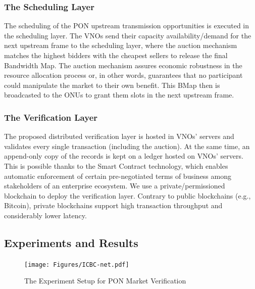 \subsubsection{The Scheduling Layer}
The scheduling of the \ac{PON} upstream transmission opportunities is executed in the scheduling layer. The \acp{VNO} send their capacity availability/demand for the next upstream frame to the scheduling layer, where the auction mechanism \cite{8488596} matches the highest bidders with the cheapest sellers to release the final Bandwidth Map. The auction mechanism assures economic robustness in the resource allocation process or, in other words, guarantees that no participant could manipulate the market to their own benefit.
This \ac{BMap} then is broadcasted to the \acp{ONU} to grant them slots in the next upstream frame.
\subsubsection{The Verification Layer}
The proposed distributed verification layer is hosted in \acp{VNO}' servers and validates every single transaction (including the auction). At the same time, an append-only copy of the records is kept on a ledger hosted on \acp{VNO}' servers. This is possible thanks to the Smart Contract technology, which enables automatic enforcement of certain pre-negotiated terms of business among stakeholders of an enterprise ecosystem.
We use a private/permissioned blockchain to deploy the verification layer. Contrary to public blockchains (e.g., Bitcoin), private blockchains support high transaction throughput and considerably lower latency. 

\subsection{Experiments and Results} \label{bc:pon:sec:results}

\begin{figure}[htbp]
  \centering
  \texttt{[image: Figures/ICBC-net.pdf]}
\caption{The Experiment Setup for \ac{PON} Market Verification}
\label{Fig_bc_pon_VMs}
\end{figure}


